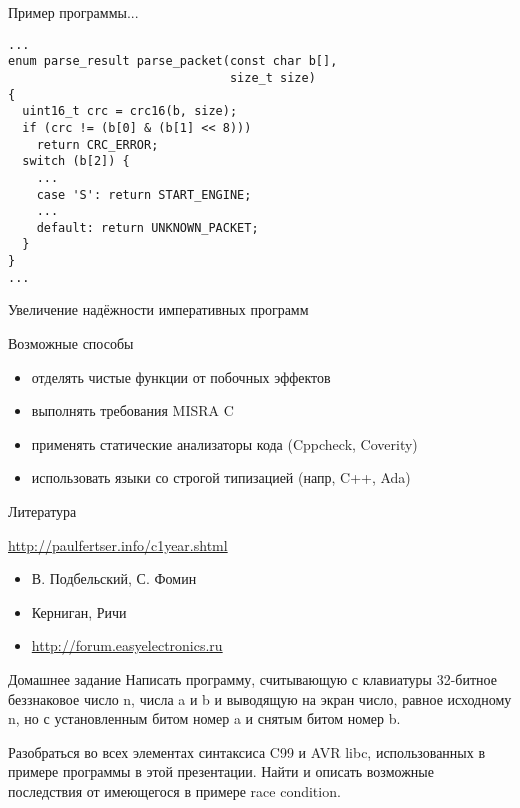 \documentclass[t]{beamer}
\renewcommand{\emph}[1]{{\color{blue} #1}}
\begin{document}
\begin{frame}[fragile]{Пример программы...}
\begin{lstlisting}
...
enum parse_result parse_packet(const char b[],
                               size_t size)
{
  uint16_t crc = crc16(b, size);
  if (crc != (b[0] & (b[1] << 8)))
    return CRC_ERROR;
  switch (b[2]) {
    ...
    case 'S': return START_ENGINE;
    ...
    default: return UNKNOWN_PACKET;
  }
}
...
\end{lstlisting}
\end{frame}

\begin{frame}{Увеличение надёжности императивных программ}
  \begin{block}{Возможные способы}
  \begin{itemize}
  \item отделять чистые функции от побочных эффектов
  \item выполнять требования MISRA C
  \item применять статические анализаторы кода (Cppcheck, Coverity)
  \item использовать языки со строгой типизацией (напр, C++, Ada)
  \end{itemize}
  \end{block}
\end{frame}

\begin{frame}{Литература}
\Large

\url{http://paulfertser.info/c1year.shtml}

  \begin{itemize}
  \item В. Подбельский, С. Фомин
  \item Керниган, Ричи
  \item \url{http://forum.easyelectronics.ru}
  \end{itemize}
\end{frame}

\begin{frame}{Домашнее задание}
\Large
  Написать программу, считывающую с клавиатуры 32-битное беззнаковое
  число \emph{n}, числа \emph{a} и \emph{b} и выводящую на экран
  число, равное исходному \emph{n}, но с установленным битом номер
  \emph{a} и снятым битом номер \emph{b}.
  \vfill

  Разобраться во всех элементах синтаксиса C99 и AVR libc,
  использованных в примере программы в этой презентации. Найти и
  описать возможные последствия от имеющегося в примере \emph{race
    condition}.
\end{frame}
\end{document}
